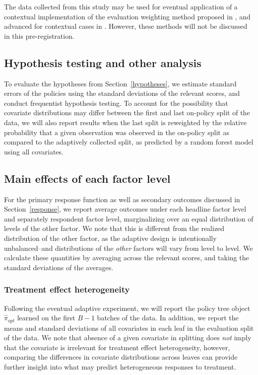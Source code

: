 \documentclass[letterpaper, 12pt, parskip=full,]{scrartcl}
\begin{document}
The data collected from this study may be used for eventual application of a contextual implementation of the evaluation weighting method proposed in \cite{hadad2019confidence}, and advanced for contextual cases in \cite{zhan2020retrospective}. However, these methods will not be discussed in this pre-registration. 


\subsection{Hypothesis testing and other analysis}
To evaluate the hypotheses from Section~\ref{hypotheses}, we estimate standard errors of the policies using the standard deviations of the relevant scores, and conduct frequentist hypothesis testing. To account for the possibility that covariate distributions may differ between the first and last on-policy split of the data, we will also report results when the last split is reweighted by the relative probability that a given observation was observed in the on-policy split as compared to the adaptively collected split, as predicted by a random forest model using all covariates. 


\subsection{Main effects of each factor level}\label{main}
For the primary response function as well as secondary outcomes discussed in Section~\ref{response}, we report average outcomes under each headline factor level and separately respondent factor level, marginalizing over an equal distribution of levels of the other factor. We note that this is different from the realized distribution of the other factor, as the adaptive design is intentionally unbalanced--and distributions of the \textit{other} factors will vary from level to level. We calculate these quantities by averaging across the relevant scores, and taking the standard deviations of the averages. 

\subsubsection{Treatment effect heterogeneity}
Following the eventual adaptive experiment, we will report the policy tree object $\hat{\pi}_{opt}$ learned on the first $B-1$ batches of the data. In addition, we report the means and standard deviations of all covariates in each leaf in the evaluation split of the data. We note that absence of a given covariate in splitting does \textit{not} imply that the covariate is irrelevant for treatment effect heterogeneity, however, comparing the differences in covariate distributions across leaves can provide further insight into what may predict heterogeneous responses to treatment. 
\end{document}
